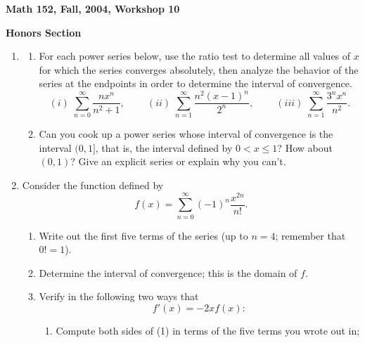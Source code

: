 \documentclass[12pt]{article}
\begin{document}
\begin{center}

{\large \bf Math 152, Fall, 2004, Workshop 10\par}
\vspace{.5cm}
{{\bf Honors Section} 
\par}
\end{center}

\begin{enumerate}

\item \begin{enumerate}

\item For each power series below, use the ratio test to 
determine all values of $x$ for which the 
series converges absolutely, then analyze the behavior 
of the series at the endpoints in order to 
determine the interval of convergence. 
$$(i)\; \sum_{n=0}^{\infty}\frac{nx^{n}}{n^{2}+1},\;\;\;\;\;\;\;\;
(ii)\; \sum_{n=1}^{\infty}\frac{n^{2}(x-1)^{n}}{2^{n}},\;\;\;\;\;\;\;\;
(iii)\; \sum_{n=1}^{\infty}\frac{3^{n}x^{n}}{n^{2}}.$$

\item Can you cook up a power series whose interval of convergence 
is the interval $(0, 1]$, that is, the 
interval defined by $0 < x \le 1$? How about $(0, 1)$? 
Give an explicit series or explain why you can't.

\end{enumerate}

\item Consider the function defined by 
$$f(x) = \sum_{n=0}^{\infty}(-1)^{n}\frac{x^{2n}}{n!}.$$

\begin{enumerate}

\item Write out the first five terms of the series (up to $n = 4$; 
remember that $0! = 1$). 

\item Determine the interval of convergence; this is the domain of $f$. 

\item Verify in the following two ways that 
\begin{equation}
f'(x) = -2xf(x):
\end{equation}

\begin{enumerate}

\item Compute both sides of (1) in terms of the five terms 
you wrote out in; 


\end{enumerate}
\end{enumerate}
\end{enumerate}
\end{document}
